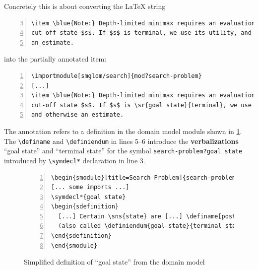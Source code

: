 \documentclass{llncs}
\def\llangle{\langle\kern-.2em\langle}
\def\rrangle{\rangle\kern-.2em\rangle}
\begin{document}
Concretely this is about converting the {\LaTeX} string
\begin{lstlisting}[numbers=left,firstnumber=3,
caption=The unannotated {\LaTeX} sources of \cref{fig:lo},label=lst:los]
\item \blue{Note:} Depth-limited minimax requires an evaluation for every
cut-off state $s$. If $s$ is terminal, we use its utility, and otherwise
an estimate.
\end{lstlisting}
into the partially annotated item:
\begin{lstlisting}[morekeywords={sr,importmodule},numbers=left,
caption=Annotating ``terminal'' in \cref{lst:los},label=lst:losa]
\importmodule[smglom/search]{mod?search-problem}
[...]
\item \blue{Note:} Depth-limited minimax requires an evaluation for every
cut-off state $s$. If $s$ is \sr{goal state}{terminal}, we use its utility,
and otherwise an estimate.
\end{lstlisting}

The annotation refers to a definition in the domain model module shown in \cref{fig:state-space}.
The \lstinline|\definame| and \lstinline|\definiendum| in lines 5--6 introduce the \textbf{verbalizations} ``goal state'' and ``terminal state'' for the symbol \lstinline|search-problem?goal state| introduced by \lstinline|\symdecl*| declaration in line 3.

\begin{figure}[ht]\centering
\begin{lstlisting}[morekeywords={definame,symdecl,definiendum},numbers=left]
\begin{smodule}[title=Search Problem]{search-problem}
[... some imports ...]
\symdecl*{goal state}
\begin{sdefinition}
  [...] Certain \sns{state} are [...] \definame[post=s]{goal state} [...]
  (also called \definiendum{goal state}{terminal states}).
\end{sdefinition}
\end{smodule}
\end{lstlisting}
  \caption{Simplified definition of ``goal state'' from the domain model}\label{fig:state-space}
\end{figure}
\end{document}
